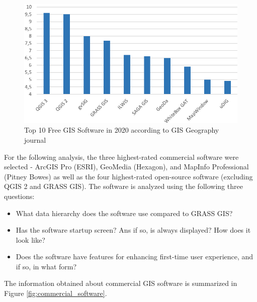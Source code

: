\documentclass[a4paper,10pt,twoside]{article}
\begin{document}
\begin{figure}[hbt!] 
\begin{center}
\includegraphics[width=13cm]{../pictures/hodnoceni_free.png} 
\caption[Top 10 Free GIS Software in 2020 according to GISGeography journal]{Top 10 Free GIS Software in 2020 according to GIS Geography journal \cite{gisgeography}}
\label{fig:hodnoceni_free}
\end{center}
\end{figure}

\noindent For the following analysis, the three highest-rated commercial software were selected - ArcGIS Pro (ESRI), GeoMedia (Hexagon), and MapInfo Professional (Pitney Bowes) as well as the four highest-rated open-source software (excluding QGIS 2 and GRASS GIS). The software is analyzed using the following three questions:

\begin{itemize}
\item What data hierarchy does the software use compared to GRASS GIS?
\item Has the software startup screen? Ans if so, is always displayed? How does it look like? 
\item Does the software have features for enhancing first-time user experience, and if so, in what form?
\end{itemize}

\noindent The information obtained about commercial GIS software is summarized in Figure \ref{fig:commercial_software}.
\end{document}
